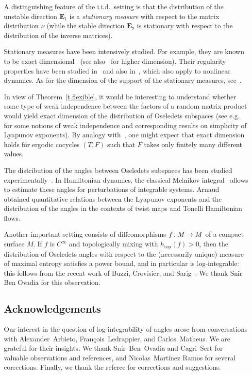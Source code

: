 \documentclass[AHL,Unicode,longabstracts,published]{cedram}
\DeclareMathOperator{\topp}{top}
\newcommand{\E}{\mathbf{E}}
\renewcommand*{\to}{\mathchoice{\longrightarrow}{\rightarrow}{\rightarrow}{\rightarrow}}
\begin{document}
A distinguishing feature of the i.i.d.\ setting is that the distribution of the unstable direction $\E_1$ is a \emph{stationary measure} with respect to the matrix distribution $\nu$ (while the stable direction $\E_2$ is stationary with respect to the distribution of the inverse matrices).

Stationary measures have been intensively studied. For example, they are known to be exact dimensional~\cite{HS} (see also~\cite{LL,rapaport} for higher dimension). Their regularity properties have been studied in~\cite{kaufmann} and also in~\cite{GKM,Monakov}, which also apply to nonlinear dynamics. As for the dimension of the support of the stationary measures, see~\cite{CJ}.

In view of Theorem~\ref{t.flexible}, it would be interesting to understand whether some type of weak independence between the factors of a random matrix product would yield exact dimension of the distribution of Oseledets subspaces (see e.g.~\cite{AvilaViana,ledrappierpositive} for some notions of weak independence and corresponding results on simplicity of Lyapunov exponents). By analogy with~\cite{Feng}, one might expect that exact dimension holds for ergodic cocycles $(T,F)$ such that $F$ takes only finitely many different values.


The distribution of the angles between Oseledets subspaces has been studied experimentally~\cite{experimental1,experimental2}. In Hamiltonian dynamics, the classical Melnikov integral~\cite{melnikov} allows to estimate these angles for perturbations of integrable systems. Arnaud~\cite{marieclaude} obtained quantitative relations between the Lyapunov exponents and the distribution of the angles in the contexts of twist maps and Tonelli Hamiltonian flows.

Another important setting consists of diffeomorphisms $f \colon M \to M$ of a compact surface $M$. If $f$ is $C^\infty$ and topologically mixing with $h_{\topp}(f)>0$, then the distribution of Oseledets angles with respect to the (necessarily unique) measure of maximal entropy satisfies a power bound, and in particular is log-integrable: this follows from the recent work of Buzzi, Crovisier, and Sarig~\cite[Corollary~1.11 and Lemma~9.3]{BCS}. We thank Snir Ben Ovadia for this observation.


\subsection*{Acknowledgements}

Our interest in the question of log-integrability of angles arose from conversations with Alexander~Arbieto, François~Ledrappier, and Carlos~Matheus. We are grateful for their insights. We thank Snir~Ben~Ovadia and Cagri~Sert for valuable observations and references, and Nicolas~Mart\'inez Ramos for several corrections. Finally, we thank the referee for corrections and suggestions.




\end{document}
